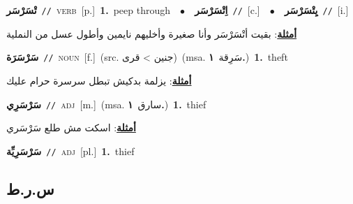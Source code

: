 \documentclass[10pt,a4paper,twoside]{article} %
\begin{document}
\begin{multicols}{2}
{\setlength\topsep{0pt}\textbf{\foreignlanguage{arabic}{تْسَرْسَر}}\ {\color{gray}\texttt{//}\color{black}}\ \textsc{verb}\ [p.]\ \textbf{1.}~peep through\ \ $\bullet$\ \ \setlength\topsep{0pt}\textbf{\foreignlanguage{arabic}{اِتْسَرْسَر}}\ {\color{gray}\texttt{//}\color{black}}\ [c.]\ \ $\bullet$\ \ \setlength\topsep{0pt}\textbf{\foreignlanguage{arabic}{يِتْسَرْسَر}}\ {\color{gray}\texttt{//}\color{black}}\ [i.]\  \begin{flushright}\color{gray}\foreignlanguage{arabic}{\textbf{\underline{\foreignlanguage{arabic}{أمثلة}}}: بقيت أتْسَرْسَر وأنا صغيرة وأخليهم نايمين وأطول عسل من النملية}\end{flushright}\color{black}} \vspace{2mm}

{\setlength\topsep{0pt}\textbf{\foreignlanguage{arabic}{سَرْسَرَة}}\ {\color{gray}\texttt{//}\color{black}}\ \textsc{noun}\ [f.]\ (src. \color{gray}\foreignlanguage{arabic}{جنين > قرى}\color{black})\ \color{gray}(msa. \foreignlanguage{arabic}{سَرِقة}~\foreignlanguage{arabic}{\textbf{١.}})\color{black}\ \textbf{1.}~theft\  \begin{flushright}\color{gray}\foreignlanguage{arabic}{\textbf{\underline{\foreignlanguage{arabic}{أمثلة}}}: يزلمة بدكيش تبطل سرسرة حرام عليك}\end{flushright}\color{black}} \vspace{2mm}

{\setlength\topsep{0pt}\textbf{\foreignlanguage{arabic}{سَرْسَرِي}}\ {\color{gray}\texttt{//}\color{black}}\ \textsc{adj}\ [m.]\ \color{gray}(msa. \foreignlanguage{arabic}{سارق}~\foreignlanguage{arabic}{\textbf{١.}})\color{black}\ \textbf{1.}~thief\  \begin{flushright}\color{gray}\foreignlanguage{arabic}{\textbf{\underline{\foreignlanguage{arabic}{أمثلة}}}: اسكت مش طلع سَرْسَري}\end{flushright}\color{black}} \vspace{2mm}

{\setlength\topsep{0pt}\textbf{\foreignlanguage{arabic}{سَرْسَرِيِّة}}\ {\color{gray}\texttt{//}\color{black}}\ \textsc{adj}\ [pl.]\ \textbf{1.}~thief\ } \vspace{2mm}

\vspace{-3mm}
\subsection*{\color{blue}\foreignlanguage{arabic}{س.ر.ط}\color{blue}{}} 


\end{multicols}
\end{document}
